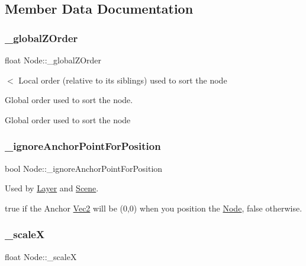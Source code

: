 \subsection{Member Data Documentation}
\mbox{\label{classNode_ada8c37d773103afb51bd5ca06bdb42b2}} 
\subsubsection{\texorpdfstring{\+\_\+global\+Z\+Order}{\_globalZOrder}}
{\footnotesize\ttfamily float Node\+::\+\_\+global\+Z\+Order\hspace{0.3cm}{\ttfamily [protected]}}



$<$ Local order (relative to its siblings) used to sort the node 

Global order used to sort the node.

Global order used to sort the node \mbox{\label{classNode_aef122b1552bec154a2a8923641b4e0f2}} 
\subsubsection{\texorpdfstring{\+\_\+ignore\+Anchor\+Point\+For\+Position}{\_ignoreAnchorPointForPosition}}
{\footnotesize\ttfamily bool Node\+::\+\_\+ignore\+Anchor\+Point\+For\+Position\hspace{0.3cm}{\ttfamily [protected]}}



Used by \hyperlink{classLayer}{Layer} and \hyperlink{classScene}{Scene}. 

true if the Anchor \hyperlink{classVec2}{Vec2} will be (0,0) when you position the \hyperlink{classNode}{Node}, false otherwise. \mbox{\label{classNode_ad297aabd4789b5bdb3ddff6034691edb}} 
\subsubsection{\texorpdfstring{\+\_\+scaleX}{\_scaleX}}
{\footnotesize\ttfamily float Node\+::\+\_\+scaleX\hspace{0.3cm}{\ttfamily [protected]}}



